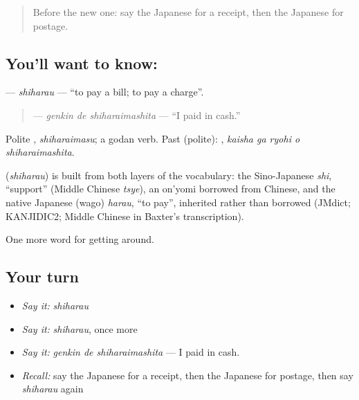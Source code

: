 \label{lesson:JA-C420-shiharau}



\begin{quote}
Before the new one: say the Japanese for a receipt, then the Japanese for postage.
\end{quote}

\subsection*{You'll want to know: }
\textbf{} — \emph{shiharau} — \textquotedblleft{}to pay a bill; to pay a charge\textquotedblright{}.

\begin{quote}
\textbf{ } — \emph{genkin de shiharaimashita} — \textquotedblleft{}I paid in cash.\textquotedblright{}
\end{quote}

Polite \textbf{}, \emph{shiharaimasu}; a godan verb. Past (polite): \textbf{  }, \emph{kaisha ga ryohi o shiharaimashita}.

\begin{cousinweb}
\textbf{} (\emph{shiharau}) is built from both layers of the vocabulary: the Sino-Japanese \emph{shi}, \textquotedblleft{}support\textquotedblright{} (Middle Chinese \emph{tsye}), an on'yomi borrowed from Chinese, and the native Japanese (wago) \emph{harau}, \textquotedblleft{}to pay\textquotedblright{}, inherited rather than borrowed (JMdict; KANJIDIC2; Middle Chinese in Baxter's transcription).
\end{cousinweb}

\begin{grammarlens}[title={What you've built}]
One more word for getting around.
\end{grammarlens}

\subsection*{Your turn}
\begin{itemize}
\raggedright
  \item \emph{Say it:} \emph{shiharau}
  \item \emph{Say it:} \emph{shiharau}, once more
  \item \emph{Say it:} \emph{genkin de shiharaimashita} — I paid in cash.
  \item \emph{Recall:} say the Japanese for a receipt, then the Japanese for postage, then say \emph{shiharau} again
\end{itemize}

